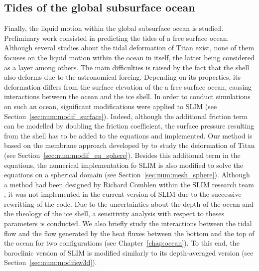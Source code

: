 \subsection{Tides of the global subsurface ocean}
Finally, the liquid motion within the global subsurface ocean is studied. Preliminary work consisted in predicting the tides of a free surface ocean. Although several studies about the tidal deformation of Titan exist, none of them focuses on the liquid motion within the ocean in itself, the latter being considered as a layer among others. The main difficulties is raised by the fact that the shell also deforms due to the astronomical forcing. Depending on its properties, its deformation differs from the surface elevation of the a free surface ocean, causing interactions between the ocean and the ice shell. In order to conduct simulations on such an ocean, significant modifications were applied to SLIM (see Section~\ref{sec:num:modif_surface}). Indeed, although the additional friction term can be modelled by doubling the friction coefficient, the surface pressure resulting from the shell has to be added to the equations and implemented. Our method is based on the membrane approach developed by \cite{beuthe2015tides,beuthe2015tidal} to study the deformation of Titan (see Section~\ref{sec:num:modif_eq_sphere}). Besides this additional term in the equations, the numerical implementation fo SLIM is also modified to solve the equations on a spherical domain (see Section~\ref{sec:num:mesh_sphere}). Although a method had been designed by Richard Comblen within the SLIM research team \citep[see][]{comblen2009finite}, it was not implemented in the current version of SLIM due to the successive rewritting of the code. Due to the uncertainties about the depth of the ocean and the rheology of the ice shell, a sensitivity analysis with respect to theses parameters is conducted. We also briefly study the interactions between the tidal flow and the flow generated by the heat fluxes between the bottom and the top of the ocean for two configurations (see Chapter~\ref{chap:ocean}). To this end, the baroclinic version of SLIM is modified similarly to its depth-averaged version (see Section~\ref{sec:num:modifsw3d}).




